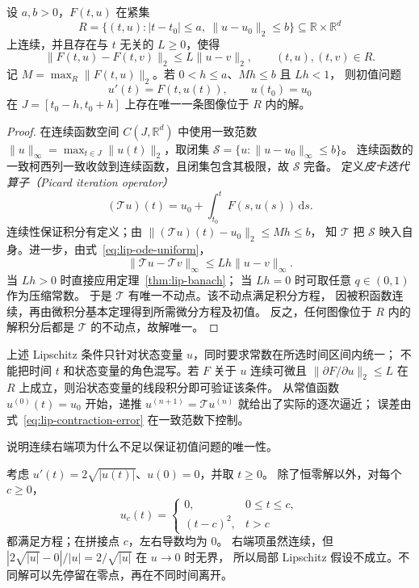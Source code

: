 \documentclass[UTF8,12pt,a4paper,fontset=fandol]{ctexart}
\begin{document}
\begin{theorem}[初值问题的局部存在唯一性]\label{thm:lip-picard}
设 $a,b>0$，$F(t,u)$ 在紧集
\[
  R=\{(t,u):|t-t_0|\le a,\ \|u-u_0\|_2\le b\}
  \subseteq\mathbb R\times\mathbb R^d
\]
上连续，并且存在与 $t$ 无关的 $L\ge0$，使得
\begin{equation}\label{eq:lip-ode-uniform}
  \|F(t,u)-F(t,v)\|_2\le L\|u-v\|_2,\qquad (t,u),(t,v)\in R.
\end{equation}
记 $M=\max_R\|F(t,u)\|_2$。若 $0<h\le a$、$Mh\le b$ 且 $Lh<1$，
则初值问题
\[
  u'(t)=F(t,u(t)),\qquad u(t_0)=u_0
\]
在 $J=[t_0-h,t_0+h]$ 上存在唯一一条图像位于 $R$ 内的解。
\end{theorem}
\begin{proof}
在连续函数空间 $C(J,\mathbb R^d)$ 中使用一致范数
$\|u\|_\infty=\max_{t\in J}\|u(t)\|_2$，取闭集
$\mathcal S=\{u:\|u-u_0\|_\infty\le b\}$。
连续函数的一致柯西列一致收敛到连续函数，且闭集包含其极限，故 $\mathcal S$ 完备。
定义\emph{皮卡迭代算子（Picard iteration operator）}
\[
  (\mathcal Tu)(t)=u_0+\int_{t_0}^{t}F(s,u(s))\,\mathrm ds.
\]
连续性保证积分有定义；由 $\|(\mathcal Tu)(t)-u_0\|_2\le Mh\le b$，
知 $\mathcal T$ 把 $\mathcal S$ 映入自身。进一步，由式~\eqref{eq:lip-ode-uniform}，
\[
  \|\mathcal Tu-\mathcal Tv\|_\infty\le Lh\|u-v\|_\infty.
\]
当 $Lh>0$ 时直接应用定理~\ref{thm:lip-banach}；
当 $Lh=0$ 时可取任意 $q\in(0,1)$ 作为压缩常数。
于是 $\mathcal T$ 有唯一不动点。该不动点满足积分方程，
因被积函数连续，再由微积分基本定理得到所需微分方程及初值。
反之，任何图像位于 $R$ 内的解积分后都是 $\mathcal T$ 的不动点，故解唯一。
\end{proof}

上述 Lipschitz 条件只针对状态变量 $u$，同时要求常数在所选时间区间内统一；
不能把时间 $t$ 和状态变量的角色混写。若 $F$ 关于 $u$ 连续可微且
$\|\partial F/\partial u\|_2\le L$ 在 $R$ 上成立，则沿状态变量的线段积分即可验证该条件。
从常值函数 $u^{(0)}(t)=u_0$ 开始，递推
$u^{(n+1)}=\mathcal Tu^{(n)}$ 就给出了实际的逐次逼近；
误差由式~\eqref{eq:lip-contraction-error} 在一致范数下控制。

\begin{example}\label{ex:lip-ode-nonunique}
说明连续右端项为什么不足以保证初值问题的唯一性。
\end{example}
\begin{solve}
考虑 $u'(t)=2\sqrt{|u(t)|}$、$u(0)=0$，并取 $t\ge0$。
除了恒零解以外，对每个 $c\ge0$，
\[
  u_c(t)=
  \begin{cases}
    0,&0\le t\le c,\\
    (t-c)^2,&t>c
  \end{cases}
\]
都满足方程；在拼接点 $c$，左右导数均为 $0$。
右端项虽然连续，但 $|2\sqrt{|u|}-0|/|u|=2/\sqrt{|u|}$ 在 $u\to0$ 时无界，
所以局部 Lipschitz 假设不成立。不同解可以先停留在零点，再在不同时间离开。
\end{solve}
\end{document}
